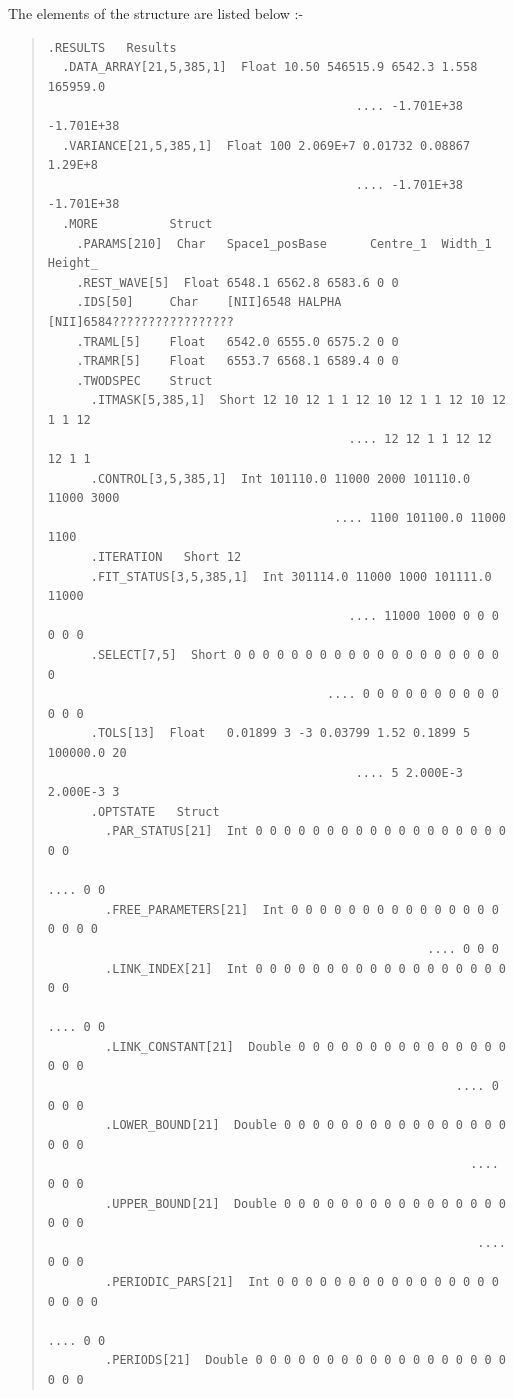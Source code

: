 \documentclass[11pt,twoside]{article}
\begin{document}
 The elements of the structure are listed below :-

\begin{quote}
\small
\begin{verbatim}
.RESULTS   Results
  .DATA_ARRAY[21,5,385,1]  Float 10.50 546515.9 6542.3 1.558 165959.0
                                           .... -1.701E+38 -1.701E+38
  .VARIANCE[21,5,385,1]  Float 100 2.069E+7 0.01732 0.08867 1.29E+8
                                           .... -1.701E+38 -1.701E+38
  .MORE          Struct
    .PARAMS[210]  Char   Space1_posBase      Centre_1  Width_1   Height_
    .REST_WAVE[5]  Float 6548.1 6562.8 6583.6 0 0
    .IDS[50]     Char    [NII]6548 HALPHA    [NII]6584?????????????????
    .TRAML[5]    Float   6542.0 6555.0 6575.2 0 0
    .TRAMR[5]    Float   6553.7 6568.1 6589.4 0 0
    .TWODSPEC    Struct
      .ITMASK[5,385,1]  Short 12 10 12 1 1 12 10 12 1 1 12 10 12 1 1 12
                                          .... 12 12 1 1 12 12 12 1 1
      .CONTROL[3,5,385,1]  Int 101110.0 11000 2000 101110.0 11000 3000
                                        .... 1100 101100.0 11000 1100
      .ITERATION   Short 12
      .FIT_STATUS[3,5,385,1]  Int 301114.0 11000 1000 101111.0 11000
                                          .... 11000 1000 0 0 0 0 0 0
      .SELECT[7,5]  Short 0 0 0 0 0 0 0 0 0 0 0 0 0 0 0 0 0 0 0 0
                                       .... 0 0 0 0 0 0 0 0 0 0 0 0 0
      .TOLS[13]  Float   0.01899 3 -3 0.03799 1.52 0.1899 5 100000.0 20
                                           .... 5 2.000E-3 2.000E-3 3
      .OPTSTATE   Struct
        .PAR_STATUS[21]  Int 0 0 0 0 0 0 0 0 0 0 0 0 0 0 0 0 0 0 0 0
                                                             .... 0 0
        .FREE_PARAMETERS[21]  Int 0 0 0 0 0 0 0 0 0 0 0 0 0 0 0 0 0 0 0
                                                     .... 0 0 0
        .LINK_INDEX[21]  Int 0 0 0 0 0 0 0 0 0 0 0 0 0 0 0 0 0 0 0 0
                                                             .... 0 0
        .LINK_CONSTANT[21]  Double 0 0 0 0 0 0 0 0 0 0 0 0 0 0 0 0 0 0
                                                         .... 0 0 0 0
        .LOWER_BOUND[21]  Double 0 0 0 0 0 0 0 0 0 0 0 0 0 0 0 0 0 0 0
                                                           .... 0 0 0
        .UPPER_BOUND[21]  Double 0 0 0 0 0 0 0 0 0 0 0 0 0 0 0 0 0 0 0
                                                            .... 0 0 0
        .PERIODIC_PARS[21]  Int 0 0 0 0 0 0 0 0 0 0 0 0 0 0 0 0 0 0 0 0
                                                             .... 0 0
        .PERIODS[21]  Double 0 0 0 0 0 0 0 0 0 0 0 0 0 0 0 0 0 0 0 0 0

\end{verbatim}
\end{quote}
\end{document}
